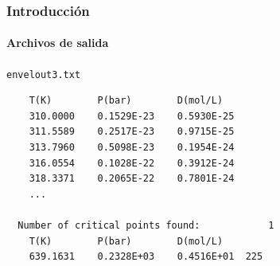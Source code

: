 \documentclass[aspectratio=1610,multi,rgb]{beamer}
\begin{document}
\begin{frame}[c, fragile]
    \frametitle{Introducción}
    \framesubtitle{Archivos de salida}
\texttt{envelout3.txt}
\begin{lstlisting}
    T(K)        P(bar)        D(mol/L)
    310.0000    0.1529E-23    0.5930E-25
    311.5589    0.2517E-23    0.9715E-25
    313.7960    0.5098E-23    0.1954E-24
    316.0554    0.1028E-22    0.3912E-24
    318.3371    0.2065E-22    0.7801E-24
    ...

  Number of critical points found:            1
    T(K)        P(bar)        D(mol/L)
    639.1631    0.2328E+03    0.4516E+01  225
\end{lstlisting}
    
\end{frame}
\end{document}

